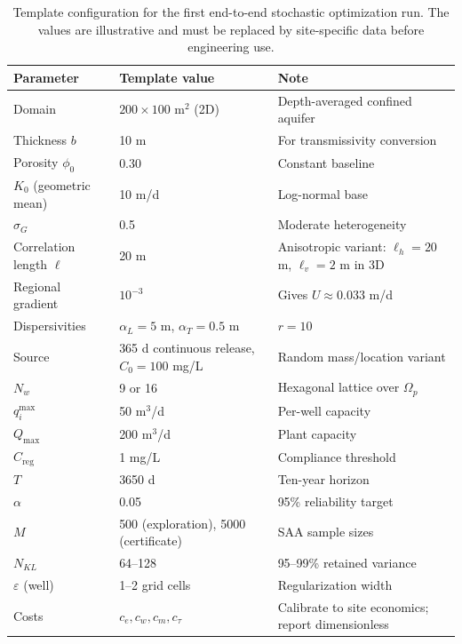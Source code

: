 \documentclass[11pt]{article}
\numberwithin{equation}{section}
\newcommand{\tabhead}[1]{\textbf{#1}}
\theoremstyle{plain}
\begin{document}
\begin{table}[htbp]
\centering
\small
\begin{tabularx}{\textwidth}{@{}lYY@{}}
\toprule
\tabhead{Parameter} & \tabhead{Template value} & \tabhead{Note}\\
\midrule
Domain & $200\times100$ m$^2$ (2D) & Depth-averaged confined aquifer\\
Thickness $b$ & 10 m & For transmissivity conversion\\
Porosity $\phi_0$ & 0.30 & Constant baseline\\
$K_0$ (geometric mean) & 10 m/d & Log-normal base\\
$\sigma_G$ & 0.5 & Moderate heterogeneity\\
Correlation length $\ell$ & 20 m & Anisotropic variant: $\ell_h=20$ m,
$\ell_v=2$ m in 3D\\
Regional gradient & $10^{-3}$ & Gives $U\approx0.033$ m/d\\
Dispersivities & $\alpha_L=5$ m, $\alpha_T=0.5$ m & $r=10$\\
Source & 365 d continuous release, $C_0=100$ mg/L & Random mass/location
variant\\
$N_w$ & 9 or 16 & Hexagonal lattice over $\Omega_p$\\
$q_i^{\max}$ & 50 m$^3$/d & Per-well capacity\\
$Q_{\max}$ & 200 m$^3$/d & Plant capacity\\
$C_{\mathrm{reg}}$ & 1 mg/L & Compliance threshold\\
$T$ & 3650 d & Ten-year horizon\\
$\alpha$ & 0.05 & 95\% reliability target\\
$M$ & 500 (exploration), 5000 (certificate) & SAA sample sizes\\
$N_{KL}$ & 64--128 & 95--99\% retained variance\\
$\varepsilon$ (well) & 1--2 grid cells & Regularization width\\
Costs & $c_e,c_w,c_m,c_\tau$ & Calibrate to site economics; report
dimensionless\\
\bottomrule
\end{tabularx}
\caption{Template configuration for the first end-to-end stochastic
optimization run.  The values are illustrative and must be replaced by
site-specific data before engineering use.}
\label{tab:benchmark}
\end{table}
\end{document}
